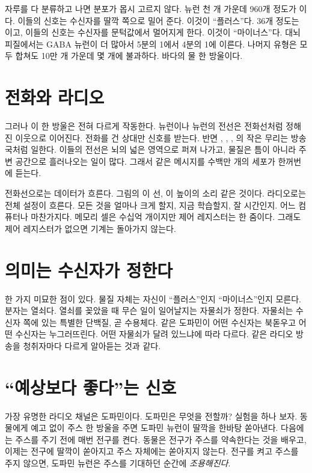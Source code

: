 자루를 다 분류하고 나면 분포가 몹시 고르지 않다. 뉴런 천 개 가운데 960개 정도가 이다. 이들의 신호는 수신자를 딸깍 쪽으로 밀어 준다. 이것이 “플러스”다. 36개 정도는 이고, 이들의 신호는 수신자를 문턱값에서 멀어지게 한다. 이것이 “마이너스”다. 대뇌 피질에서는 GABA 뉴런이 더 많아서 5분의 1에서 4분의 1에 이른다. 나머지 유형은 모두 합쳐도 10만 개 가운데 몇 개에 불과하다. 바다의 물 한 방울이다.

\section*{전화와 라디오}

그러나 이 한 방울은 전혀 다르게 작동한다.  뉴런이나  뉴런의 전선은 전화선처럼 정해진 이웃으로 이어진다. 전화를 건 상대만 신호를 받는다. 반면 , , , 의 작은 무리는 방송국처럼 일한다. 이들의 전선은 뇌의 넓은 영역으로 퍼져 나가고, 물질은 틈이 아니라 주변 공간으로 흘러나오는 일이 많다. 그래서 같은 메시지를 수백만 개의 세포가 한꺼번에 듣는다.

전화선으로는 데이터가 흐른다. 그림의 이 선, 이 높이의 소리 같은 것이다. 라디오로는 전체 설정이 흐른다. 모든 것을 얼마나 크게 할지, 지금 학습할지, 잘 시간인지. 어느 컴퓨터나 마찬가지다. 메모리 셀은 수십억 개이지만 제어 레지스터는 한 줌이다. 그래도 제어 레지스터가 없으면 기계는 돌아가지 않는다.

\section*{의미는 수신자가 정한다}

한 가지 미묘한 점이 있다. 물질 자체는 자신이 “플러스”인지 “마이너스”인지 모른다. 분자는 열쇠다. 열쇠를 꽂았을 때 무슨 일이 일어날지는 자물쇠가 정한다. 자물쇠는 수신자 쪽에 있는 특별한 단백질, 곧 수용체다. 같은 도파민이 어떤 수신자는 북돋우고 어떤 수신자는 누그러뜨린다. 어떤 자물쇠가 달려 있느냐에 따라 다르다. 같은 라디오 방송을 청취자마다 다르게 알아듣는 것과 같다.

\section*{“예상보다 좋다”는 신호}

가장 유명한 라디오 채널은 도파민이다. 도파민은 무엇을 전할까? 실험을 하나 보자. 동물에게 예고 없이 주스 한 방울을 주면 도파민 뉴런이 딸깍을 한바탕 쏟아낸다. 다음에는 주스를 주기 전에 매번 전구를 켠다. 동물은 전구가 주스를 약속한다는 것을 배우고, 이제는 전구에 딸깍이 쏟아지고 주스 자체에는 쏟아지지 않는다. 전구를 켜고 주스를 주지 않으면, 도파민 뉴런은 주스를 기대하던 순간에 \emph{조용해진다}.

